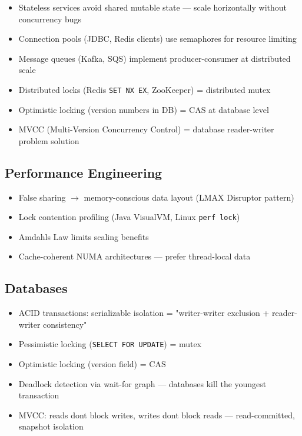 \documentclass[11pt]{article}
\providecommand{\tightlist}{\setlength{\itemsep}{1pt}\setlength{\parskip}{0pt}}
\begin{document}
\begin{itemize}
\tightlist
\item
  Stateless services avoid shared mutable state --- scale horizontally without concurrency bugs
\item
  Connection pools (JDBC, Redis clients) use semaphores for resource limiting
\item
  Message queues (Kafka, SQS) implement producer-consumer at distributed scale
\item
  Distributed locks (Redis \texttt{SET\ NX\ EX}, ZooKeeper) = distributed mutex
\item
  Optimistic locking (version numbers in DB) = CAS at database level
\item
  MVCC (Multi-Version Concurrency Control) = database reader-writer problem solution
\end{itemize}

\subsection{Performance Engineering}\label{performance-engineering}

\begin{itemize}
\tightlist
\item
  False sharing \(\rightarrow\) memory-conscious data layout (LMAX Disruptor pattern)
\item
  Lock contention profiling (Java VisualVM, Linux \texttt{perf\ lock})
\item
  Amdahl\textquotesingle s Law limits scaling benefits
\item
  Cache-coherent NUMA architectures --- prefer thread-local data
\end{itemize}

\subsection{Databases}\label{databases}

\begin{itemize}
\tightlist
\item
  ACID transactions: serializable isolation = "writer-writer exclusion + reader-writer consistency"
\item
  Pessimistic locking (\texttt{SELECT\ FOR\ UPDATE}) = mutex
\item
  Optimistic locking (version field) = CAS
\item
  Deadlock detection via wait-for graph --- databases kill the youngest transaction
\item
  MVCC: reads don\textquotesingle t block writes, writes don\textquotesingle t block reads --- read-committed, snapshot isolation
\end{itemize}
\end{document}
